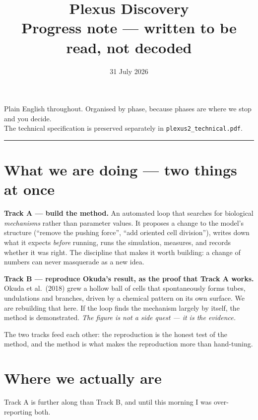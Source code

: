 \documentclass[11pt,a4paper]{article}
\title{\textbf{Plexus Discovery}\\[6pt]
\large Progress note --- written to be read, not decoded}
\author{}
\date{31 July 2026}
\begin{document}
\maketitle
\vspace{-2.2\baselineskip}

\begin{center}\small\color{grey}
Plain English throughout. Organised by phase, because phases are where we stop and you decide.\\
The technical specification is preserved separately in \texttt{plexus2\_technical.pdf}.
\end{center}

\vspace{4pt}
\hrule
\vspace{10pt}

\section{What we are doing --- two things at once}

\textbf{Track A --- build the method.} An automated loop that searches for biological
\emph{mechanisms} rather than parameter values. It proposes a change to the model's structure
(``remove the pushing force'', ``add oriented cell division''), writes down what it expects
\emph{before} running, runs the simulation, measures, and records whether it was right. The
discipline that makes it worth building: a change of numbers can never masquerade as a new idea.

\textbf{Track B --- reproduce Okuda's result, as the proof that Track A works.} Okuda et al.\
(2018) grew a hollow ball of cells that spontaneously forms tubes, undulations and branches,
driven by a chemical pattern on its own surface. We are rebuilding that here. If the loop finds
the mechanism largely by itself, the method is demonstrated. \emph{The figure is not a side quest
--- it is the evidence.}

The two tracks feed each other: the reproduction is the honest test of the method, and the method
is what makes the reproduction more than hand-tuning.

\section{Where we actually are}

Track A is further along than Track B, and until this morning I was over-reporting both.
\end{document}
